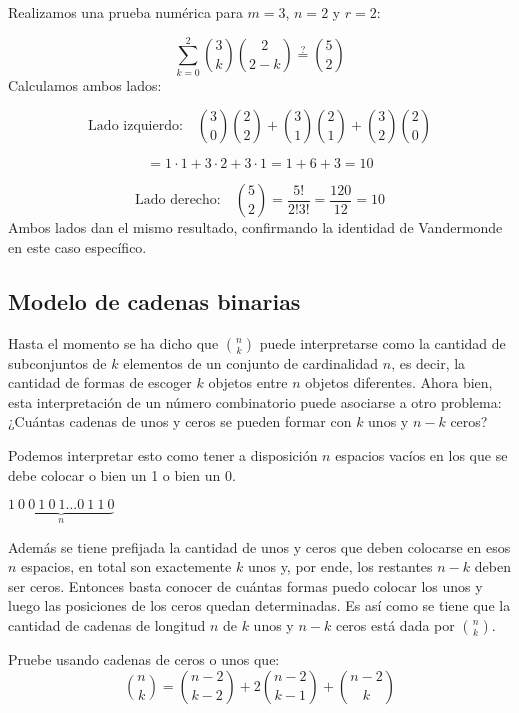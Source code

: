 \begin{demostracion}
Realizamos una prueba numérica para \(m = 3\), \(n = 2\) y \(r = 2\):

\[ \sum_{k=0}^{2} \binom{3}{k} \binom{2}{2-k} \stackrel{?}{=} \binom{5}{2} \]
Calculamos ambos lados:

\[ \text{Lado izquierdo:} \quad \binom{3}{0} \binom{2}{2} + \binom{3}{1} \binom{2}{1} + \binom{3}{2} \binom{2}{0} \]

\[ = 1 \cdot 1 + 3 \cdot 2 + 3 \cdot 1 = 1 + 6 + 3 = 10 \]

\[ \text{Lado derecho:} \quad \binom{5}{2} = \frac{5!}{2!3!} = \frac{120}{12} = 10 \]
Ambos lados dan el mismo resultado, confirmando la identidad de Vandermonde en este caso específico.
\end{demostracion}

\subsection{Modelo de cadenas binarias}
Hasta el momento se ha dicho que $\displaystyle\binom{n}{k}$ puede interpretarse como la cantidad de subconjuntos de $k$ elementos de un conjunto de cardinalidad $n$, es decir, la cantidad de formas de escoger $k$ objetos entre $n$ objetos diferentes. Ahora bien, esta interpretación de un número combinatorio puede asociarse a otro problema:¿Cuántas cadenas de unos y ceros se pueden formar con $k$ unos y $n-k$ ceros?

Podemos interpretar esto como tener a disposición $n$ espacios vacíos en los que se debe colocar o bien un 1 o bien un 0.

\begin{center}
    $\underbrace{1\ 0\ 0\ 1\ 0\ 1...0\ 1\ 1\ 0}_{n}$
\end{center}

Además se tiene prefijada la cantidad de unos y ceros que deben colocarse en esos $n$ espacios, en total son exactemente $k$ unos y, por ende, los restantes $n-k$ deben ser ceros.  Entonces basta conocer de cuántas formas puedo colocar los unos y luego las posiciones de los ceros quedan determinadas. Es así como se tiene que
la cantidad de cadenas de longitud $n$ de $k$ unos y $n-k$ ceros está dada por $\displaystyle\binom{n}{k}$.

\begin{ejemplo}
Pruebe usando cadenas de ceros o unos que:
\[\binom{n}{k}=\binom{n-2}{k-2}+2\binom{n-2}{k-1}+\binom{n-2}{k}\]
\end{ejemplo}

